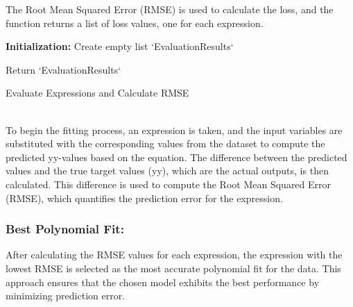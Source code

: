 \documentclass{article}
\begin{document}
The Root Mean Squared Error (RMSE) is used to calculate the loss, and the function returns a list of loss values, one for each expression.\\


\begin{algorithm}[H]
\SetAlgoLined
{}

\textbf{Initialization:}\;
Create empty list `EvaluationResults`\;


Return `EvaluationResults`\;

\caption{Evaluate Expressions and Calculate RMSE}
\label{alg:evaluate_expressions} %
\end{algorithm}\\

To begin the fitting process, an expression is taken, and the input variables are substituted with the corresponding values from the dataset to compute the predicted yy-values based on the equation. The difference between the predicted values and the true target values (yy), which are the actual outputs, is then calculated. This difference is used to compute the Root Mean Squared Error (RMSE), which quantifies the prediction error for the expression.\\

\subsubsection{Best Polynomial Fit:}

After calculating the RMSE values for each expression, the expression with the lowest RMSE is selected as the most accurate polynomial fit for the data. This approach ensures that the chosen model exhibits the best performance by minimizing prediction error.\\
\end{document}
